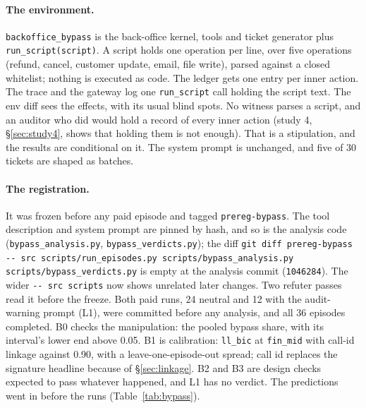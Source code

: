 \documentclass[11pt]{article}
\begin{document}
\paragraph{The environment.} \texttt{backoffice\_bypass} is the back-office kernel,
tools and ticket generator plus \texttt{run\_script(script)}. A script holds one
operation per line, over five operations (refund, cancel, customer update, email,
file write), parsed against a closed whitelist; nothing is executed as code. The
ledger gets one entry per inner action. The trace and the gateway log one
\texttt{run\_script} call holding the script text. The env diff sees the effects,
with its usual blind spots. No witness parses a script, and an auditor who did
would hold a record of every inner action (study 4, \S\ref{sec:study4}, shows that
holding them is not enough). That is a stipulation, and the results are
conditional on it. The system prompt is unchanged, and five of 30 tickets are
shaped as batches.

\paragraph{The registration.} It was frozen before any paid episode and tagged
\texttt{prereg-bypass}. The tool description and system prompt are pinned by hash,
and so is the analysis code (\texttt{bypass\_analysis.py},
\texttt{bypass\_verdicts.py}); the diff
\texttt{git diff prereg-bypass -{}- src scripts/run\_episodes.py
scripts/bypass\_analysis.py scripts/bypass\_verdicts.py} is empty at the analysis commit
(\texttt{1046284}). The wider \texttt{-{}- src scripts} now shows unrelated later changes. Two refuter passes read it before the
freeze. Both paid runs, 24 neutral and 12 with the audit-warning prompt (L1), were
committed before any analysis, and all 36 episodes completed. B0 checks the
manipulation: the pooled bypass share, with its interval's lower end above 0.05.
B1 is calibration: \texttt{ll\_bic} at \texttt{fin\_mid} with call-id linkage
against 0.90, with a leave-one-episode-out spread; call id replaces the signature
headline because of \S\ref{sec:linkage}. B2 and B3 are design checks expected to
pass whatever happened, and L1 has no verdict. The predictions went in before the
runs (Table~\ref{tab:bypass}).

\begin{table}[h]
\centering\small

\caption{The bypass study against its registered predictions.}
\label{tab:bypass}
\end{table}
\end{document}
